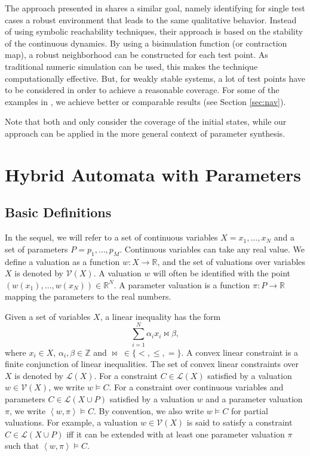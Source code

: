 \documentclass{llncs}
\newcommand{\Reals}{\ensuremath{\mathbb{R}}}
\newcommand{\Ints}{\ensuremath{\mathbb{Z}}}
\newcommand{\valuation}{\ensuremath{\mathcal{V}}}
\begin{document}
The approach presented in \cite{JFG+:2007} shares a similar goal,
namely identifying for single test cases a robust environment that
leads to the same qualitative behavior. Instead of using symbolic
reachability techniques, their approach is based on the stability of
the continuous dynamics. By using a bisimulation function (or
contraction map), a robust neighborhood can be constructed for each
test point. As traditional numeric simulation can be used, this makes
the technique computationally effective. But, for weakly stable
systems, a lot of test points have to be considered in order to
achieve a reasonable coverage. For some of the examples in
\cite{JFG+:2007}, we achieve better or comparable results (see Section
\ref{sec:nav}).

Note that both \cite{AKRS:2008} and \cite{JFG+:2007} only consider the
coverage of the initial states, while our approach can be applied in the
more general context of parameter synthesis.


\section{Hybrid Automata with Parameters} \label{sec:lha}
\subsection{Basic Definitions}
In the sequel, we will refer to a set of continuous variables $X =
{x_1, \dots, x_N}$ and a set of parameters $P = {p_1, \dots, p_M}$. 
Continuous variables can take any real value. We define a valuation as
a function $w: X \rightarrow \Reals$, and the set of valuations
over variables $X$ is denoted by $\valuation(X)$. A valuation $w$ will
often be identified with the point $(w(x_1), \dots, w(x_N)) \in
\Reals^N$. A parameter valuation is a function $\pi: P \rightarrow
\Reals$ mapping the parameters to the  real numbers.

Given a set of variables $X$, a linear inequality has the form
\begin{equation}
  \sum \limits_{i=1}^{N} \alpha_i x_i \bowtie \beta,
\end{equation}
where $x_i \in X$, $\alpha_i, \beta \in \Ints$ and $\bowtie\; \in \{<,
\leq, =\}$. A convex linear constraint is a finite conjunction of
linear inequalities. The set of convex linear constraints over $X$ is
denoted by $\mathcal{L}(X)$. For a constraint $C \in \mathcal{L}(X)$
satisfied by a valuation $w \in \mathcal{V}(X)$, we write $w \models
C$. For a constraint over continuous variables and parameters $C \in
\mathcal{L}(X \cup P)$ satisfied by a valuation $w$ and a parameter
valuation $\pi$, we write $\left<w, \pi\right> \models C$. By
convention, we also write $w \models C$ for partial valuations. For
example, a valuation $w \in \mathcal{V}(X)$ is said to satisfy a
constraint $C \in \mathcal{L}(X \cup P)$ iff it can be extended with
at least one parameter valuation $\pi$ such that $\left<w, \pi\right>
\models C$.
\end{document}
